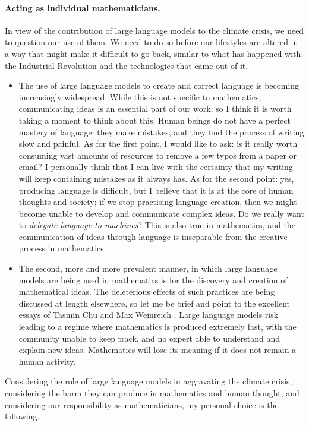 \documentclass[a4paper,12pt]{article}
\begin{document}
	\paragraph{Acting as individual mathematicians.}
	In view of the contribution of large language models to the climate crisis, we need to question our use of them.
	We need to do so before our lifestyles are altered in a way that might make it difficult to go back, similar to what has happened with the Industrial Revolution and the technologies that came out of it.
	\begin{itemize}
		\item The use of large language models to create and correct language is becoming increasingly widespread.
		While this is not specific to mathematics, communicating ideas is an essential part of our work, so I think it is worth taking a moment to think about this.
		Human beings do not have a perfect mastery of language: they make mistakes, and they find the process of writing slow and painful.
		As for the first point, I would like to ask: is it really worth consuming vast amounts of resources to remove a few typos from a paper or email?
		I personally think that I can live with the certainty that my writing will keep containing mistakes as it always has.
		As for the second point: yes, producing language is difficult, but I believe that it is at the core of human thoughts and society; if we stop practising language creation, then we might become unable to develop and communicate complex ideas.
		Do we really want to \emph{delegate language to machines}?
		This is also true in mathematics, and the communication of ideas through language is inseparable from the creative process in mathematics.
		\item The second, more and more prevalent manner, in which large language models are being used in mathematics is for the discovery and creation of mathematical ideas.
		The deleterious effects of such practices are being discussed at length elsewhere, so let me be brief and point to the excellent essays of Tasmin Chu \cite{chu} and Max Weinreich \cite{weinreich}.
		Large language models risk leading to a regime where mathematics is produced extremely fast, with the community unable to keep track, and no expert able to understand and explain new ideas.
		Mathematics will lose its meaning if it does not remain a human activity.
	\end{itemize}
	
	Considering the role of large language models in aggravating the climate crisis, considering the harm they can produce in mathematics and human thought, and considering our responsibility as mathematicians, my personal choice is the following.
	
\end{document}
